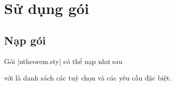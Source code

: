 \documentclass[11pt,oneside]{ltxdoc}
\theoremstyle{marginbreak}
\theoremstyle{changebreak}
\theoremstyle{change}
\theoremstyle{plain}
\theoremstyle{nonumberplain}
\begin{document}

\section{Sử dụng gói}


\subsection{Nạp gói}

Gói |ntheorem.sty| có thể nạp như sau
\begin{command}
  \usepackage[`']{ntheorem}
\end{command}
với  là danh sách các tuỳ chọn và các yêu cầu đặc biệt.
\end{document}
